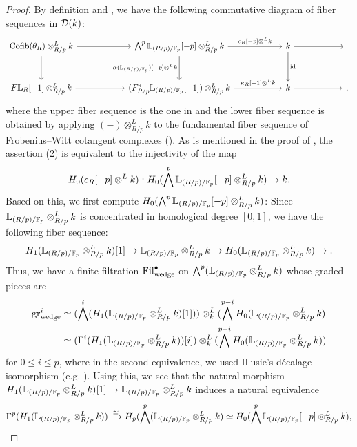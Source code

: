 \documentclass[11pt,a4paper]{amsart}
\begin{document}
\begin{proof}
    By definition and , we have the following commutative diagram of fiber sequences in $\mathcal{D}(k)$:
\[\begin{tikzcd}[column sep=2cm, row sep=1cm]
\Cofib(\theta_R)\otimes^L_{R/p}k \arrow[r] \arrow[d] & \bigwedge^p\Cot_{(R/p)/\setF_p}[-p]\otimes^L_{R/p}k \arrow[r,"{c_R[-p]\otimes^L k}"] \arrow[d,"{\alpha(\Cot_{(R/p)/\setF_p})[-p]\otimes ^L k}"'] & k \arrow[r] \arrow[d,"\id"] & {} \\
\FWCot_R[-1]\otimes^L_{R/p}k \arrow[r] & (F^*_{R/p}\Cot_{(R/p)/\setF_p}[-1])\otimes^L_{R/p}k \arrow[r,"{\kappa_R[-1]\otimes^L k}"] & k \arrow[r] & {,}
\end{tikzcd}\]
where the upper fiber sequence is the one in  and the lower fiber sequence is obtained by applying $(-)\otimes^L_{R/p}k$ to the fundamental fiber sequence of Frobenius--Witt cotangent complexes (\cite[Theorem 5.3]{shimada2026FrobeniusWitt}). As is mentioned in the proof of \cite[Proposition 4.19]{bhatt2023Syntomic}, the assertion (2) is equivalent to the injectivity of the map \[H_0(c_R[-p]\otimes^L k):H_0(\bigwedge^p\mathbb{L}_{(R/p)/\mathbb{F}_p}[-p]\otimes^L_{R/p}k)\to k.\] Based on this, we first compute $H_0(\bigwedge^p\mathbb{L}_{(R/p)/\mathbb{F}_p}[-p]\otimes^L_{R/p}k)$:
Since $\mathbb{L}_{(R/p)/\mathbb{F}_p}\otimes_{R/p}^Lk$ is concentrated in homological degree $[0,1]$, we have the following fiber sequence:
\[H_1(\mathbb{L}_{(R/p)/\mathbb{F}_p}\otimes_{R/p}^Lk)[1]\to \mathbb{L}_{(R/p)/\mathbb{F}_p}\otimes_{R/p}^Lk\to H_0(\mathbb{L}_{(R/p)/\mathbb{F}_p}\otimes_{R/p}^Lk)\to .\] Thus, we have a finite filtration $\operatorname{Fil}_{\mathrm{wedge}}^\bullet$ on $\bigwedge^p(\mathbb{L}_{(R/p)/\mathbb{F}_p}\otimes_{R/p}^Lk)$ whose graded pieces are \begin{align*}
    \operatorname{gr}^i_{\mathrm{wedge}}&\simeq (\bigwedge^i(H_1(\mathbb{L}_{(R/p)/\mathbb{F}_p}\otimes_{R/p}^Lk)[1]))\otimes_k^L(\bigwedge^{p-i}H_0(\mathbb{L}_{(R/p)/\mathbb{F}_p}\otimes_{R/p}^L k) \\
    &\simeq (\Gamma^i(H_1(\mathbb{L}_{(R/p)/\mathbb{F}_p}\otimes_{R/p}^Lk))[i])\otimes_k^L(\bigwedge^{p-i} H_0(\mathbb{L}_{(R/p)/\mathbb{F}_p}\otimes_{R/p}^Lk)) 
\end{align*}
for $0\le i\le p$, where in the second equivalence, we used Illusie's d\'{e}calage isomorphism (e.g. \cite[Lemma 2.6]{petrov2025Nondecomposability}).
Using this, we see that the natural morphism \(H_1(\mathbb{L}_{(R/p)/\mathbb{F}_p} \otimes^L_{R/p} k)[1] \to \mathbb{L}_{(R/p)/\mathbb{F}_p} \otimes^L_{R/p} k\) induces a natural equivalence
\begin{equation*}
    \Gamma^p(H_1(\Cot_{(R/p)/\setF_p}\otimes^L_{R/p}k)) \xrightarrow{\simeq} H_p(\bigwedge^p(\Cot_{(R/p)/\setF_p}\otimes^L_{R/p}k) \simeq H_0(\bigwedge^p\Cot_{(R/p)/\setF_p}[-p]\otimes^L_{R/p}k),

\end{equation*}
\end{proof}
\end{document}
